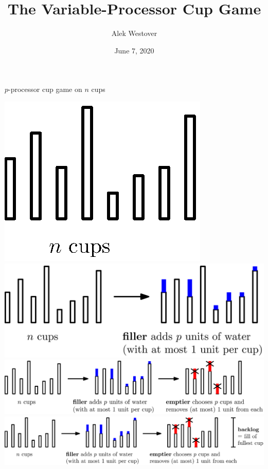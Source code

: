 \documentclass[xcolor=x11names, svgnames, rgb]{beamer}
\title{The Variable-Processor Cup Game}
\author{Alek Westover}
\institute{Belmont High School}
\date{June 7, 2020}
\begin{document}
 
\frame{\titlepage}

\begin{frame}[c]{$p$-processor cup game on $n$ cups}
  \begin{overprint}
     \includegraphics[width=\linewidth]{initDef/initDef0.eps}
     \includegraphics[width=\linewidth]{initDef/initDef1.eps}
     \includegraphics[width=\linewidth]{initDef/initDef2.eps}
     \includegraphics[width=\linewidth]{initDef/initDef3.eps}
  \end{overprint}
\end{frame}
\end{document}
